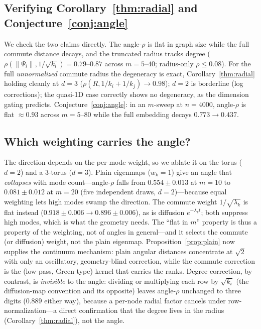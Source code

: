 \documentclass[11pt]{article}
\theoremstyle{remark}
\begin{document}
\subsection{\texorpdfstring{Verifying Corollary~\ref{thm:radial} and
Conjecture~\ref{conj:angle}}{Verifying the degeneracy corollary and the angular
conjecture}}\label{sec:verify}
We check the two claims directly. The angle-$\rho$ is flat in graph size
while the full commute distance decays, and
the truncated radius tracks degree ($\rho(\lVert\Psi_i\rVert,1/\sqrt{k_i})=
0.79$--$0.87$ across $m=5$--$40$; radius-only $\rho\le0.08$). For the full
\emph{unnormalized} commute radius the degeneracy is exact,
Corollary~\ref{thm:radial} holding cleanly
at $d=3$ ($\rho(R,1/k_i+1/k_j)\to0.98$); $d=2$ is borderline (log corrections);
the quasi-1D case correctly shows no degeneracy, as the dimension gating
predicts. Conjecture~\ref{conj:angle}: in an $m$-sweep at $n=4000$, angle-$\rho$
is flat $\approx0.93$ across $m=5$--$80$ while the full embedding decays
$0.773\to0.437$.

\subsection{Which weighting carries the angle?}\label{sec:ablation}
The direction depends on the per-mode weight, so we ablate it on the torus
($d{=}2$) and a $3$-torus ($d{=}3$). Plain eigenmaps ($w_k{=}1$) give an angle
that \emph{collapses} with mode count---angle-$\rho$ falls from $0.554\pm0.013$ at
$m{=}10$ to $0.081\pm0.012$ at $m{=}20$ (five independent draws, $d{=}2$)---because
equal weighting lets high modes swamp the direction. The commute weight
$1/\sqrt{\lambda_k}$ is flat instead ($0.918\pm0.006\to0.896\pm0.006$), as is
diffusion $e^{-\lambda_k t}$; both suppress high modes,
which is what the geometry needs. The ``flat in $m$'' property is thus a property
of the weighting, not of angles in general---and it selects the commute (or
diffusion) weight, not the plain eigenmap. Proposition~\ref{prop:plain} now
supplies the continuum mechanism: plain angular distances concentrate at
$\sqrt2$ with only an oscillatory, geometry-blind correction, while the
commute correction is the (low-pass, Green-type) kernel that carries the
ranks. Degree correction, by contrast, is
\emph{invisible} to the angle: dividing or multiplying each row by $\sqrt{k_i}$
(the diffusion-map convention and its opposite) leaves angle-$\rho$ unchanged to
three digits ($0.889$ either way), because a per-node radial factor cancels under
row-normalization---a direct confirmation that the degree lives in the radius
(Corollary~\ref{thm:radial}), not the angle.
\end{document}
